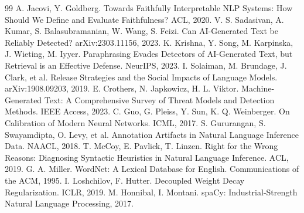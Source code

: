 \documentclass[11pt]{article}
\begin{document}
\begin{thebibliography}{99}
 A. Jacovi, Y. Goldberg. Towards Faithfully Interpretable NLP Systems: How Should We Define and Evaluate Faithfulness? ACL, 2020.
 V. S. Sadasivan, A. Kumar, S. Balasubramanian, W. Wang, S. Feizi. Can AI-Generated Text be Reliably Detected? arXiv:2303.11156, 2023.
 K. Krishna, Y. Song, M. Karpinska, J. Wieting, M. Iyyer. Paraphrasing Evades Detectors of AI-Generated Text, but Retrieval is an Effective Defense. NeurIPS, 2023.
 I. Solaiman, M. Brundage, J. Clark, et al. Release Strategies and the Social Impacts of Language Models. arXiv:1908.09203, 2019.
 E. Crothers, N. Japkowicz, H. L. Viktor. Machine-Generated Text: A Comprehensive Survey of Threat Models and Detection Methods. IEEE Access, 2023.
 C. Guo, G. Pleiss, Y. Sun, K. Q. Weinberger. On Calibration of Modern Neural Networks. ICML, 2017.
 S. Gururangan, S. Swayamdipta, O. Levy, et al. Annotation Artifacts in Natural Language Inference Data. NAACL, 2018.
 T. McCoy, E. Pavlick, T. Linzen. Right for the Wrong Reasons: Diagnosing Syntactic Heuristics in Natural Language Inference. ACL, 2019.
 G. A. Miller. WordNet: A Lexical Database for English. Communications of the ACM, 1995.
 I. Loshchilov, F. Hutter. Decoupled Weight Decay Regularization. ICLR, 2019.
 M. Honnibal, I. Montani. spaCy: Industrial-Strength Natural Language Processing, 2017.
\end{thebibliography}
\end{document}
